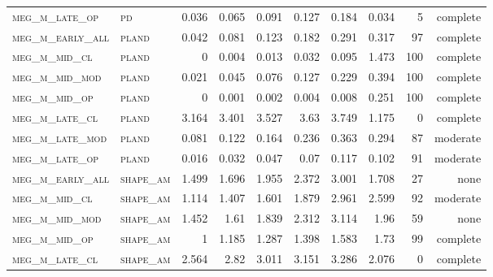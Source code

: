 \begin{landscape}
\begin{center}
\begin{footnotesize}
\begin{longtable}{llrrrrr|rrr}
\textsc{meg\_m\_late\_op  } & \textsc{pd        }    & 0.036    & 0.065    & 0.091    & 0.127    & 0.184      & 0.034         & 5             & complete             \\
\textsc{meg\_m\_early\_all} & \textsc{pland     }    & 0.042    & 0.081    & 0.123    & 0.182    & 0.291      & 0.317         & 97            & complete              \\
\textsc{meg\_m\_mid\_cl   } & \textsc{pland     }    & 0        & 0.004    & 0.013    & 0.032    & 0.095      & 1.473         & 100           & complete             \\
\textsc{meg\_m\_mid\_mod  } & \textsc{pland     }    & 0.021    & 0.045    & 0.076    & 0.127    & 0.229      & 0.394         & 100           & complete             \\
\textsc{meg\_m\_mid\_op   } & \textsc{pland     }    & 0        & 0.001    & 0.002    & 0.004    & 0.008      & 0.251         & 100           & complete             \\
\textsc{meg\_m\_late\_cl  } & \textsc{pland     }    & 3.164    & 3.401    & 3.527    & 3.63     & 3.749      & 1.175         & 0             & complete            \\
\textsc{meg\_m\_late\_mod } & \textsc{pland     }    & 0.081    & 0.122    & 0.164    & 0.236    & 0.363      & 0.294         & 87            & moderate              \\
\textsc{meg\_m\_late\_op  } & \textsc{pland     }    & 0.016    & 0.032    & 0.047    & 0.07     & 0.117      & 0.102         & 91            & moderate              \\
\textsc{meg\_m\_early\_all} & \textsc{shape\_am }    & 1.499    & 1.696    & 1.955    & 2.372    & 3.001      & 1.708         & 27            & none             \\
\textsc{meg\_m\_mid\_cl   } & \textsc{shape\_am }    & 1.114    & 1.407    & 1.601    & 1.879    & 2.961      & 2.599         & 92            & moderate              \\
\textsc{meg\_m\_mid\_mod  } & \textsc{shape\_am }    & 1.452    & 1.61     & 1.839    & 2.312    & 3.114      & 1.96          & 59            & none              \\
\textsc{meg\_m\_mid\_op   } & \textsc{shape\_am }    & 1        & 1.185    & 1.287    & 1.398    & 1.583      & 1.73          & 99            & complete              \\
\textsc{meg\_m\_late\_cl  } & \textsc{shape\_am }    & 2.564    & 2.82     & 3.011    & 3.151    & 3.286      & 2.076         & 0             & complete            \\

\end{longtable}
\end{footnotesize}
\end{center}
\end{landscape}
